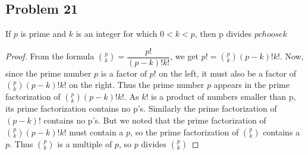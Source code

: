 \documentclass[12pt]{article}
\begin{document}
\subsection*{Problem 21}
If $p$ is prime and $k$ is an integer for which $0<k<p$, then p divides $p choose k$
\begin{proof}
From the formula ${p \choose k} = \dfrac{p!}{(p-k)!k!}$, we get $p! = {p \choose k} (p-k)!k!$. Now, since the prime number $p$ is a factor of $p!$ on the left, it must also be a factor of ${p \choose k}(p -k)!k!$ on the right. Thus the prime number $p$ appears in the prime factorization of ${p \choose k} (p-k)!k!$. As $k!$ is a product of numbers smaller than p, its prime factorization contains no p's. Similarly the prime factorization of $(p-k)!$ contains no p's. But we noted that the prime factorization of ${p \choose k} (p-k)!k!$ must contain a $p$, so the prime factorization of $p \choose k$ contains a $p$. Thus $p \choose k$ is a multiple of $p$, so $p$ divides $p \choose k$
\end{proof}
\end{document}
